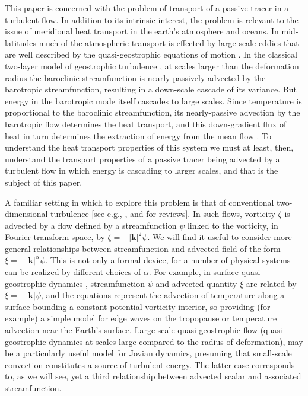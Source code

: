 \documentclass{jfm}
\newcommand{\eg}  {\textit{e.g., }}
\newcommand{\kb}  {\boldsymbol{k}}
\begin{document}
This paper is concerned with the problem of transport of a
passive tracer in a turbulent flow. In addition to its intrinsic
interest, the problem is relevant to the issue of meridional heat
transport in the earth's atmosphere and oceans. In mid-latitudes
much of the atmospheric transport is effected by large-scale
eddies that are well described by the quasi-geostrophic equations
of motion \citep[e.g.,][]{Pedlosky87}. In the classical two-layer
model of geostrophic turbulence
\citep[e.g.,][]{Rhines77,Salmon80}, at scales larger than the
deformation radius the baroclinic streamfunction is nearly
passively advected by the barotropic streamfunction, resulting in
a down-scale cascade of its variance. But energy in the
barotropic mode itself cascades to large scales. Since temperature is
proportional to the baroclinic streamfunction, its nearly-passive
advection by the barotropic flow determines the heat transport,
and this down-gradient flux of heat in turn determines the
extraction of energy from the mean flow \citep{Larichev95}.  To
understand the heat transport properties of this system we must
at least, then, understand the transport properties of a passive
tracer being advected by a turbulent flow in which energy is
cascading to larger scales, and that is the subject of this paper.

A familiar setting in which to explore this problem is that of
conventional two-di\-men\-sion\-al turbulence [see e.g.,
\citet{Kraichnan80}, \citet{Vallis93b} and \citet{danilov00} for
reviews]. In such flows, vorticity $\zeta$ is advected by a flow
defined by a streamfunction $\psi$ linked to the vorticity, in Fourier
transform space, by $\zeta = -|\kb|^2 \psi$.  We will find it useful
to consider more general relationships between streamfunction and
advected field of the form $\xi = -|\kb|^{\alpha} \psi$. This is not
only a formal device, for a number of physical systems can be realized
by different choices of $\alpha$. For example, in surface
quasi-geostrophic dynamics \citep[\eg][]{Held95a}, streamfunction
$\psi$ and advected quantity $\xi$ are related by $\xi = -|\kb| \psi$,
and the equations represent the advection of temperature along a
surface bounding a constant potential vorticity interior, so providing
(for example) a simple model for edge waves on the tropopause or
temperature advection near the Earth's surface. Large-scale
quasi-geostrophic flow (quasi-geostrophic dynamics at scales large
compared to the radius of deformation), may be a particularly useful
model for Jovian dynamics, presuming that small-scale convection
constitutes a source of turbulent energy.  The latter case corresponds
to, as we will see, yet a third relationship between advected scalar
and associated streamfunction.
\end{document}

